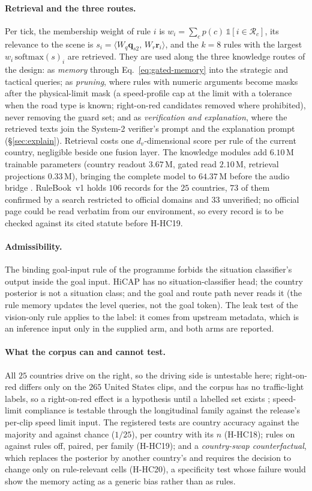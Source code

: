 \paragraph{Retrieval and the three routes.} Per tick, the membership weight of rule $i$ is $w_i=\sum_c p(c)\,\mathbb 1[i\in\mathcal R_c]$, its relevance to the scene is $s_i=\langle W_q\mathbf q_{s2},\,W_r\mathbf r_i\rangle$, and the $k=8$ rules with the largest $w_i\,\mathrm{softmax}(s)_i$ are retrieved. They are used along the three knowledge routes of the design: as \emph{memory} through Eq.~\eqref{eq:gated-memory} into the strategic and tactical queries; as \emph{pruning}, where rules with numeric arguments become masks after the physical-limit mask (a speed-profile cap at the limit with a tolerance when the road type is known; right-on-red candidates removed where prohibited), never removing the guard set; and as \emph{verification and explanation}, where the retrieved texts join the System-2 verifier's prompt and the explanation prompt (\S\ref{sec:explain}). Retrieval costs one $d_v$-dimensional score per rule of the current country, negligible beside one fusion layer. The knowledge modules add $6.10$\,M trainable parameters (country readout $3.67$\,M, gated read $2.10$\,M, retrieval projections $0.33$\,M), bringing the complete model to $64.37$\,M before the audio bridge \evM. RuleBook~v1 holds $106$ records for the $25$ countries, $73$ of them confirmed by a search restricted to official domains and $33$ unverified; no official page could be read verbatim from our environment, so every record is to be checked against its cited statute before H-HC19.
\paragraph{Admissibility.} The binding goal-input rule of the programme forbids the situation classifier's output inside the goal input. HiCAP has no situation-classifier head; the country posterior is not a situation class; and the goal and route path never reads it (the rule memory updates the level queries, not the goal token). The leak test of the vision-only rule applies to the label: it comes from upstream metadata, which is an inference input only in the supplied arm, and both arms are reported.
\paragraph{What the corpus can and cannot test.} All $25$ countries drive on the right, so the driving side is untestable here; right-on-red differs only on the $265$ United States clips, and the corpus has no traffic-light labels, so a right-on-red effect is a hypothesis until a labelled set exists \evH; speed-limit compliance is testable through the longitudinal family against the release's per-clip speed limit input. The registered tests are country accuracy against the majority and against chance ($1/25$), per country with its $n$ (H-HC18); rules on against rules off, paired, per family (H-HC19); and a \emph{country-swap counterfactual}, which replaces the posterior by another country's and requires the decision to change only on rule-relevant cells (H-HC20), a specificity test whose failure would show the memory acting as a generic bias rather than as rules.


